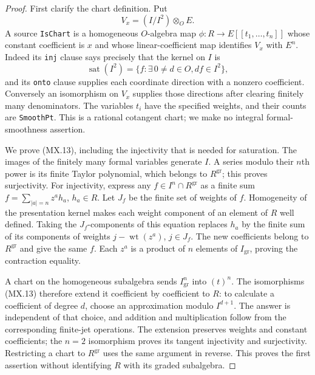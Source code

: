 \begin{proof}
First clarify the chart definition.  Put
\[
       V_x=(I/I^2)\otimes_O E.
 \tag{MX.15}
\]
A source \texttt{IsChart} is a homogeneous $O$-algebra map
$\phi:R\to E[[t_1,\ldots,t_n]]$ whose constant coefficient
is $x$ and whose linear-coefficient map identifies $V_x$
with $E^n$.  Indeed its \texttt{inj} clause says precisely
that the kernel on $I$ is
\[
 \operatorname{sat}(I^2)=\{f:\exists\,0\ne d\in O, df\in I^2\},
 \tag{MX.16}
\]
and its \texttt{onto} clause supplies each coordinate
direction with a nonzero coefficient.  Conversely an
isomorphism on $V_x$ supplies those directions after
clearing finitely many denominators.  The variables $t_i$
have the specified weights, and their counts are
\texttt{SmoothPt}.  This is a rational cotangent chart;
we make no integral formal-smoothness assertion.

We prove (MX.13), including the injectivity that is needed
for saturation.  The images of the finitely many formal
variables generate $I$.  A series modulo their $n$th power
is its finite Taylor polynomial, which belongs to
$R^{\mathrm{gr}}$; this proves surjectivity.
For injectivity, express any $f\in I^n\cap R^{\mathrm{gr}}$
as a finite sum
$f=\sum_{|a|=n}z^a h_a$, $h_a\in R$.
Let $J_f$ be the finite set of weights of $f$.
Homogeneity of the presentation kernel makes each weight
component of an element of $R$ well defined.  Taking the
$J_f$-components of this equation replaces $h_a$ by the
finite sum of its components of weights
$j-\operatorname{wt}(z^a)$, $j\in J_f$.
The new coefficients belong to $R^{\mathrm{gr}}$ and give
the same $f$.  Each $z^a$ is a product of $n$ elements
of $I_{\mathrm{gr}}$, proving the contraction equality.

A chart on the homogeneous subalgebra sends
$I_{\mathrm{gr}}^n$ into $(t)^n$.  The isomorphisms (MX.13)
therefore extend it coefficient by coefficient to $R$:
to calculate a coefficient of degree $d$, choose an
approximation modulo $I^{d+1}$.  The answer is independent
of that choice, and addition and multiplication follow
from the corresponding finite-jet operations.
The extension preserves weights and constant coefficients;
the $n=2$ isomorphism proves its tangent injectivity and
surjectivity.  Restricting a chart to $R^{\mathrm{gr}}$
uses the same argument in reverse.  This proves the first
assertion without identifying $R$ with its graded subalgebra.


\end{proof}
